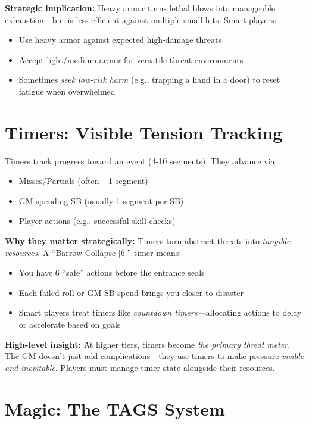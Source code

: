 \documentclass[11pt]{article}
\begin{document}
\textbf{Strategic implication:} Heavy armor turns lethal blows into manageable exhaustion—but is less efficient against multiple small hits. Smart players:
\begin{itemize}
    \item Use heavy armor against expected high-damage threats
    \item Accept light/medium armor for versatile threat environments
    \item Sometimes \textit{seek low-risk harm} (e.g., trapping a hand in a door) to reset fatigue when overwhelmed
\end{itemize}

\section{Timers: Visible Tension Tracking}

Timers track progress toward an event (4-10 segments). They advance via:
\begin{itemize}
    \item Misses/Partials (often +1 segment)
    \item GM spending SB (usually 1 segment per SB)
    \item Player actions (e.g., successful skill checks)
\end{itemize}

\textbf{Why they matter strategically:} Timers turn abstract threats into \textit{tangible resources}. A ``Barrow Collapse [6]'' timer means:
\begin{itemize}
    \item You have 6 ``safe'' actions before the entrance seals
    \item Each failed roll or GM SB spend brings you closer to disaster
    \item Smart players treat timers like \textit{countdown timers}—allocating actions to delay or accelerate based on goals
\end{itemize}

\textbf{High-level insight:} At higher tiers, timers become \textit{the primary threat meter}. The GM doesn't just add complications—they use timers to make pressure \textit{visible and inevitable}. Players must manage timer state alongside their resources.

\section{Magic: The TAGS System}
\end{document}

